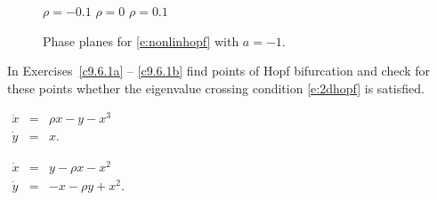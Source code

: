 \documentclass{ximera}
\begin{document}
\begin{figure}[htb]
           \centerline{%
           }
 	\vspace*{-0.2in}
	\hspace{0.3in} $\rho=-0.1$  \hspace{1.7in} $\rho=0$
		\hspace{1.8in} $\rho=0.1$ 
          \caption{Phase planes for \protect\eqref{e:nonlinhopf} with $a=-1$.}
           \label{F:nonlinhopf}
\end{figure}



\EXER

\TEXER

\noindent In Exercises~\ref{c9.6.1a} -- \ref{c9.6.1b} find points of Hopf
bifurcation and check for these points whether the eigenvalue crossing
condition \eqref{e:2dhopf} is satisfied.
\begin{exercise} \label{c9.6.1a}
$\begin{array}{rcl}
\dot{x} & = & \rho x - y -x^3 \\
\dot{y} & = & x.
\end{array}$
\end{exercise}
\begin{exercise} \label{c9.6.1b}
$\begin{array}{rcl}
\dot{x} & = & y - \rho x - x^2   \\
\dot{y} & = & -x - \rho y + x^2.
\end{array}$
\end{exercise}
\end{document}
